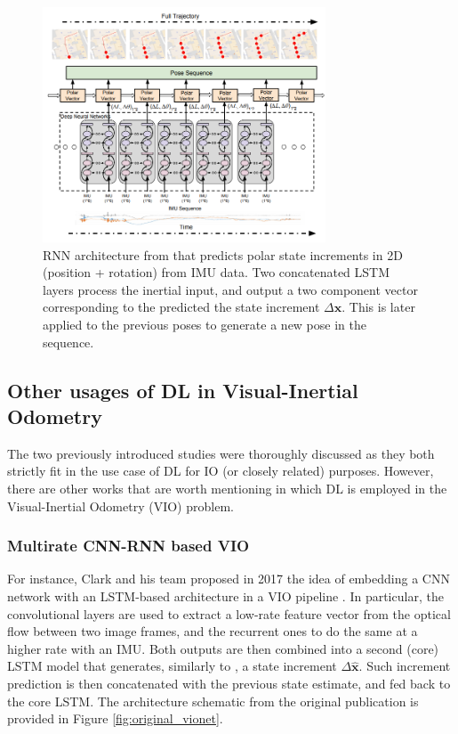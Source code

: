 \begin{figure}[h]
   \centering
   \includegraphics[width=0.75\textwidth]{thesis_template/img/ionet_original_architecture.png}
   \caption{RNN architecture from \cite{DBLP:journals/corr/abs-1802-02209} that predicts polar state increments in 2D (position + rotation) from IMU data. Two concatenated LSTM layers process the inertial input, and output a two component vector corresponding to the predicted the state increment $\Delta\mathbf{\hat{x}}$. This is later applied to the previous poses to generate a new pose in the sequence.}
   \label{fig:original_ionet}
\end{figure}
\subsection{Other usages of DL in Visual-Inertial Odometry}

The two previously introduced studies were thoroughly discussed as they both strictly fit in the use case of DL for IO (or closely related) purposes.  
However, there are other works that are worth mentioning in which DL is employed in the Visual-Inertial Odometry (VIO) problem. 

\subsubsection{Multirate CNN-RNN based VIO}\label{sec:VIOnet}
For instance, Clark and his team proposed in 2017 the idea of embedding a CNN network with an LSTM-based architecture in a VIO pipeline \cite{DBLP:journals/corr/ClarkWWMT17}. 
In particular, the convolutional layers are used to extract a low-rate feature vector from the optical flow between two image frames, and the recurrent ones to do the same at a higher rate with an IMU. 
Both outputs are then combined into a second (core) LSTM model that generates, similarly to \cite{DBLP:journals/corr/abs-1802-02209}, a state increment $\Delta\mathbf{\hat{x}}$.
Such increment prediction is then concatenated with the previous state estimate, and fed back to the core LSTM. The architecture schematic from the original publication is provided in Figure \ref{fig:original_vionet}. 

